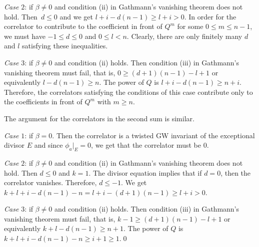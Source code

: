 \documentclass[pdftex]{sigma}
\numberwithin{equation}{section}
\begin{document}
{\em Case $2$}: if $\beta\neq 0$ and condition (ii) in Gathmann's
vanishing theorem does not hold. Then~${d\leq 0}$ and we get $l+i-d(n-1)\geq l+i>0$. In order for the correlator to contribute to the coefficient in front of $Q^m$ for some $0\leq m\leq n-1$, we must have $-1\leq d\leq 0$ and $0\leq l<n$. Clearly, there are only finitely many $d$ and $l$ satisfying these inequalities.

{\em Case $3$}: if $\beta\neq 0$ and condition (ii) holds. Then condition (iii) in Gathmann's vanishing theorem must fail, that is, $0\geq (d+1)(n-1)-l+1$ or equivalently $l-d(n-1)\geq n$. The power of $Q$ is $l+i-d(n-1)\geq n+i.$ Therefore, the correlators satisfying the conditions of this case contribute only to the coefficients in front of $Q^m$ with $m\geq n$.

The argument for the correlators in the second sum is similar.

{\em Case $1$}: if $\beta=0$. Then the correlator is a twisted GW invariant of the exceptional divisor $E$ and since $\phi_a|_E=0$, we get that the correlator must be $0$.

{\em Case $2$}: if $\beta\neq 0$ and condition (ii) in Gathmann's vanishing theorem does not hold. Then
$d\leq 0$ and $k=1$. The divisor equation implies that if $d=0$, then
the correlator vanishes. Therefore, $d\leq -1$. We get $k+l+i-d(n-1)-n=l+i-(d+1)(n-1)\geq l+i>0$.

{\em Case $3$}: if $\beta\neq 0$ and condition (ii) holds. Then condition (iii) in Gathmann's vanishing theorem must fail, that is, $k-1\geq (d+1)(n-1)-l+1$ or equivalently $k+l-d(n-1)\geq n+1$. The power of $Q$ is $k+l+i-d(n-1)-n\geq i+1\geq 1.$\qed
\end{document}
